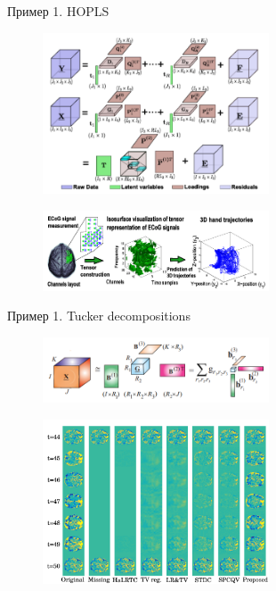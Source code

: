 \begin{frame}{Пример 1. HOPLS}
\begin{figure}
    \centering
    \includegraphics[width=0.6\textwidth]{lecture_10/figs/HOPLS.png}
\end{figure}
\begin{figure}
    \centering
    \includegraphics[width=0.6\textwidth]{lecture_10/figs/HOPLS_example.png}
\end{figure}

\end{frame}
\begin{frame}{Пример 1. Tucker decompositions}
\begin{figure}
    \centering
    \includegraphics[width=0.6\textwidth]{lecture_10/figs/Tucker_decompositions.png}
\end{figure}
\begin{figure}
    \centering
    \includegraphics[width=0.6\textwidth]{lecture_10/figs/Tucker_decompositions_example.png}
\end{figure}
\end{frame}
 